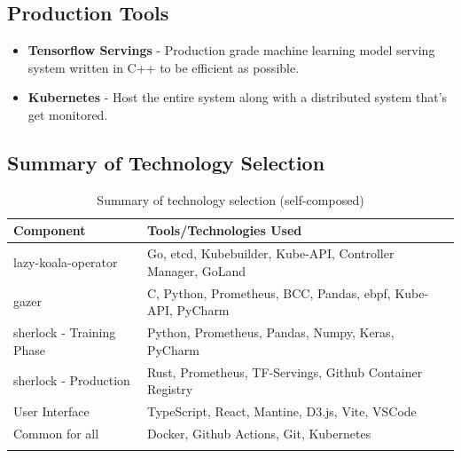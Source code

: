 \subsection{Production Tools}
\begin{itemize}[noitemsep,nolistsep] 
    \item \textbf{Tensorflow Servings} - Production grade machine learning model serving system written in C++ to be efficient as possible.
    \item \textbf{Kubernetes} - Host the entire system along with a distributed system that's get monitored.
\end{itemize}

\subsection{Summary of Technology Selection}

\begin{longtable}{|p{43mm}|p{110mm}|}
    \hline
    \textbf{Component} &
    \textbf{Tools/Technologies Used} \\ \hline

    \ac{lazy-koala-operator} &
    Go, etcd, Kubebuilder, Kube-API, Controller Manager, GoLand \\ \hline

    \ac{gazer} &
    C, Python, Prometheus, BCC, Pandas, \ac{ebpf}, Kube-API, PyCharm \\ \hline

    \ac{sherlock} - Training Phase &
    Python, Prometheus, Pandas, Numpy, Keras, PyCharm \\ \hline

    \ac{sherlock} - Production &
    Rust, Prometheus, TF-Servings, Github Container Registry\\ \hline

    User Interface &
    TypeScript, React, Mantine, D3.js, Vite, VSCode \\ \hline

    Common for all &
    Docker, Github Actions, Git, Kubernetes \\ \hline

    \caption{Summary of technology selection (self-composed)}
\end{longtable}